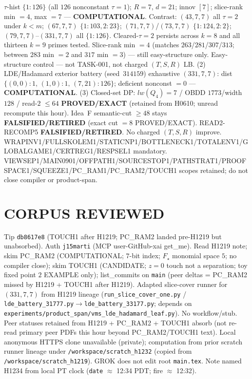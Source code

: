 \documentclass[11pt]{article}
\begin{document}
$\tau$-hist $\{1{:}126\}$ (all $126$ nonconstant $\tau{=}1$); $R{=}7$, $d{=}21$; innov $[7]$;
slice-rank min $=4$, max $=7$ --- \textbf{COMPUTATIONAL}.
Contrast: $(43,7,7)$ all $\tau{=}2$ under $k{<}m$; $(67,7,7)$ $\{1{:}103,2{:}23\}$;
$(71,7,7)$/$(73,7,7)$ $\{1{:}124,2{:}2\}$; $(79,7,7)$--$(331,7,7)$ all $\{1{:}126\}$.
Cleared-$\tau{=}2$ persists across $k{=}8$ and all thirteen $k{=}9$ primes tested.
Slice-rank min $=4$ (matches $263$/$281$/$307$/$313$; between $283$ min $=2$ and $317$ min $=3$) --- still easy-structure only.
Easy-structure control --- not TASK-001, not charged $(T,S,R)$ LB.
(2) LDE/Hadamard exterior battery (seed~$314159$) exhaustive $(331,7,7)$:
dist $\{(0,0){:}1,\,(1,0){:}1,\,(7,21){:}126\}$; deficient nonconst $=0$ --- \textbf{COMPUTATIONAL}.
(3) Closed-set DP: $lw(Q_4)=7$ / OBDD $1773$/width $128$ / read-$2$ $\le64$
\textbf{PROVED/EXACT} (retained from H0610; unread recompute this hour).
Idea~F semantic-cut $\ge48$ stays \textbf{FALSIFIED/RETIRED} (exact cut $=8$ PROVED/EXACT).
READ2-RECOMP5 \textbf{FALSIFIED/RETIRED}. No charged $(T,S,R)$ improve.
WRAPINV1/FULLSKOLEM1/STATICNP1/BOTTLENECK1/TOTALENV1/GLOBALGAME1/CERTREG1/RESPSEL1 mandatory.
VIEWSEP1/MAIN0901/OFFPATH1/SOURCESTOP1/PATHSTRAT1/PROOFSPACE1/SQUEEZE1/PC\_RAM1/PC\_RAM2/TOUCH1 scopes retained; do not close compiler or product-span.

\section*{CORPUS REVIEWED}
Tip \texttt{db8617e8} (TOUCH1 after H1219; PC\_RAM2 landed pre-H1219 but unabsorbed). Auth \texttt{j15marti} (MCP user-GitHub-xai get\_me).
Read H1219 note; skim PC\_RAM2 (COMPUTATIONAL; $7$-bit index; $F_\star$ monomial space $5$; no compiler close);
skim TOUCH1 (CANDIDATE; $z{=}0$ touch not a separation; toy fixed point $2$ EXAMPLE only);
list\_commits on \texttt{main} (peer deltas = PC\_RAM2 missed by H1219 + TOUCH1 after H1219).
Adapted slice-cover runner for $(331,7,7)$ from H1219 lineage
(\texttt{run\_slice\_cover\_one.py} / \texttt{lde\_battery\_31777.py}$\to$\texttt{lde\_battery\_33177.py};
depends on \texttt{experiments/product\_span/vms\_lde\_hadamard\_leaf.py}).
No workflow/stub. Peer statuses retained from H1219 + PC\_RAM2 + TOUCH1 absorb
(not re-read primary peer PDFs this hour beyond PC\_RAM2/TOUCH1 text).
Local anonymous HTTPS clone unavailable (private);
computation from prior scratch runner lineage under \texttt{/workspace/scratch\_h1232}
(copied from \texttt{/workspace/scratch\_h1219}).
GROK does not edit root \texttt{main.tex}.
Note named H1234 from local PT clock (\texttt{date} $\approx$ 12:34 PDT; fire $\approx$ 12:32).
\end{document}
